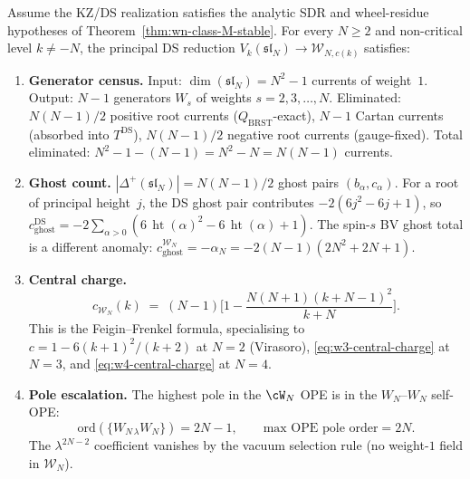 \begin{theorem}
\label{thm:universal-ds-transport}
%
Assume the KZ/DS realization satisfies the analytic SDR and
wheel-residue hypotheses of Theorem~\textup{\ref{thm:wn-class-M-stable}}.
For every $N \ge 2$ and non-critical level $k \ne -N$,
the principal DS reduction $V_k(\mathfrak{sl}_N) \to
\mathcal{W}_{N,c(k)}$ satisfies:
\begin{enumerate}[label=\textup{(\roman*)}]
\item \textbf{Generator census.}
 Input: $\dim(\mathfrak{sl}_N) = N^2 - 1$ currents of weight~$1$.
 Output: $N - 1$ generators $W_s$ of weights $s = 2, 3, \ldots, N$.
 Eliminated: $N(N-1)/2$ positive root currents
 \textup{(}$Q_{\mathrm{BRST}}$-exact\textup{)},
 $N - 1$ Cartan currents
 \textup{(}absorbed into $T^{\mathrm{DS}}$\textup{)},
 $N(N-1)/2$ negative root currents
 \textup{(}gauge-fixed\textup{)}.
 Total eliminated: $N^2 - 1 - (N - 1) = N^2 - N
 = N(N-1)$ currents.
\item \textbf{Ghost count.}
 $|\Delta^+(\mathfrak{sl}_N)| = N(N-1)/2$ ghost pairs
 $(b_\alpha, c_\alpha)$. For a root of principal height~$j$, the DS
 ghost pair contributes $-2(6j^2-6j+1)$, so
 $c_{\mathrm{ghost}}^{\mathrm{DS}}
 =-2\sum_{\alpha>0}(6\,\operatorname{ht}(\alpha)^2
 -6\,\operatorname{ht}(\alpha)+1)$. The spin-$s$ BV ghost total is a
 different anomaly:
 $c_{\mathrm{ghost}}^{\mathcal{W}_N} = -\alpha_N
 = -2(N-1)(2N^2 + 2N + 1)$.
\item \textbf{Central charge.}
 \begin{equation}
 \label{eq:wN-central-charge-ds}
 c_{\mathcal{W}_N}(k)
 \;=\; (N-1)\biggl[1 - \frac{N(N+1)(k + N - 1)^2}{k + N}\biggr].
 \end{equation}
 This is the Feigin--Frenkel formula, specialising to
 $c = 1 - 6(k+1)^2/(k+2)$ at $N = 2$ \textup{(Virasoro)},
 \eqref{eq:w3-central-charge} at $N = 3$, and
 \eqref{eq:w4-central-charge} at $N = 4$.
\item \textbf{Pole escalation.}
 The highest pole in the $\cW_N$ OPE is in the
 $W_N$--$W_N$ self-OPE:
 \begin{equation}
 \label{eq:wn-max-pole}
 \mathrm{ord}(\{W_{N\,\lambda} W_N\}) = 2N - 1,
 \qquad
 \text{max OPE pole order} = 2N.
 \end{equation}
 The $\lambda^{2N-2}$ coefficient vanishes by the vacuum selection
 rule \textup{(}no weight-$1$ field in $\mathcal{W}_N$\textup{)}.

\end{enumerate}
\end{theorem}
